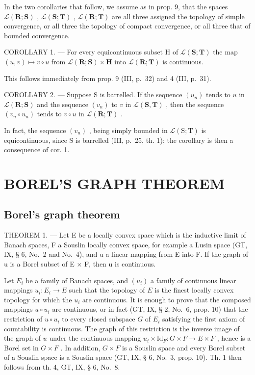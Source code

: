 In the two corollaries that follow, we assume as in prop. 9, that the spaces \(\mathcal{L}(\mathbf{R};\mathbf{S})\) , \(\mathcal{L}(\mathbf{S};\mathbf{T})\) , \(\mathcal{L}(\mathbf{R};\mathbf{T})\) are all three assigned the topology of simple convergence, or all three the topology of compact convergence, or all three that of bounded convergence.

COROLLARY 1. --- For every equicontinuous subset H of \(\mathcal{L}(\mathbf{S};\mathbf{T})\) the map \((u,v)\mapsto v\circ u\) from \(\mathcal{L}(\mathbf{R};\mathbf{S})\times \mathbf{H}\) into \(\mathcal{L}(\mathbf{R};\mathbf{T})\) is continuous.

This follows immediately from prop. 9 (III, p.~32) and 4 (III, p.~31).

COROLLARY 2. --- Suppose S is barrelled. If the sequence \((u_n)\) tends to \(u\) in \(\mathcal{L}(\mathbf{R};\mathbf{S})\) and the sequence \((v_{n})\) to \(v\) in \(\mathcal{L}(\mathbf{S},\mathbf{T})\) , then the sequence \((v_{n}\circ u_{n})\) tends to \(v\circ u\) in \(\mathcal{L}(\mathbf{R};\mathbf{T})\) .

In fact, the sequence \((v_{n})\) , being simply bounded in \(\mathcal{L}(\mathrm{S};\mathrm{T})\) is equicontinuous, since \(\mathrm{S}\) is barrelled (III, p.~25, th. 1); the corollary is then a consequence of cor. 1.

\section{BOREL'S GRAPH THEOREM}

\subsection{Borel's graph theorem}

THEOREM 1. --- Let E be a locally convex space which is the inductive limit of Banach spaces, F a Souslin locally convex space, for example a Lusin space (GT, IX, § 6, No.~2 and No.~4), and u a linear mapping from E into F. If the graph of u is a Borel subset of E × F, then u is continuous.

Let \(E_i\) be a family of Banach spaces, and \((u_i)\) a family of continuous linear mappings \(u_i: E_i \to E\) such that the topology of \(E\) is the finest locally convex topology for which the \(u_i\) are continuous. It is enough to prove that the composed mappings \(u \circ u_i\) are continuous, or in fact (GT, IX, § 2, No.~6, prop. 10) that the restriction of \(u \circ u_i\) to every closed subspace \(G\) of \(E_i\) satisfying the first axiom of countability is continuous. The graph of this restriction is the inverse image of the graph of \(u\) under the continuous mapping \(u_i \times \text{Id}_F: G \times F \to E \times F\) , hence is a Borel set in \(G \times F\) . In addition, \(G \times F\) is a Souslin space and every Borel subset of a Souslin space is a Souslin space (GT, IX, § 6, No.~3, prop. 10). Th. 1 then follows from th. 4, GT, IX, § 6, No.~8.

